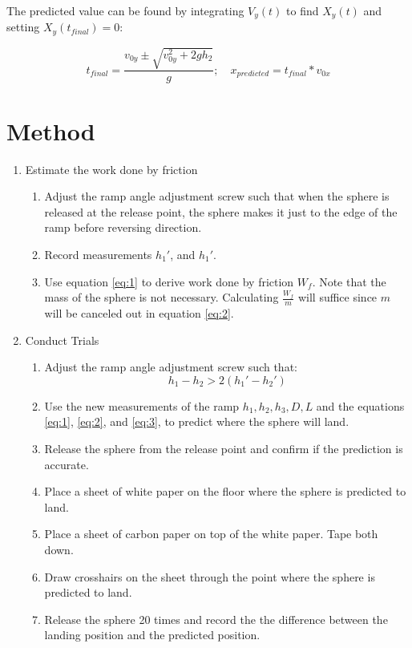 \documentclass{article}
\begin{document}
The predicted value can be found by integrating $V_{y}(t)$ to find $X_{y}(t)$ and setting $X_{y}(t_{final}) = 0$:


\begin{equation}
    t_{final} = \frac{v_{0y} \pm \sqrt{v_{0y}^2 + 2gh_{2}}}{g}; \quad x_{predicted} = t_{final} * v_{0x}
\end{equation}


\clearpage
\section{Method}
\begin{enumerate}

    \item Estimate the work done by friction 
        \begin{enumerate}
            \item Adjust the ramp angle adjustment screw such that when the sphere is released at the release point, the sphere makes it just to the edge of the ramp before reversing direction.
            \item Record measurements $h_{1}\ensuremath{'}$, and $h_{1}\ensuremath{'}$.
            \item Use equation \eqref{eq:1} to derive work done by friction $W_{f}$. Note that the mass of the sphere is not necessary. Calculating $\frac{W_{f}}{m}$ will suffice since $m$ will be canceled out in equation \eqref{eq:2}.
        \end{enumerate}

    \item Conduct Trials
        \begin{enumerate}
            \item Adjust the ramp angle adjustment screw such that: \\
                \begin{equation} h_{1} - h_{2} > 2(h_{1}\ensuremath{'} - h_{2}\ensuremath{'}) \end{equation}
            \item Use the new measurements of the ramp $h_{1}, h_{2}, h_{3}, D, L$ and the equations \eqref{eq:1}, \eqref{eq:2}, and \eqref{eq:3}, to predict where the sphere will land. 
            \item Release the sphere from the release point and confirm if the prediction is accurate.
            \item Place a sheet of white paper on the floor where the sphere is predicted to land.
            \item Place a sheet of carbon paper on top of the white paper. Tape both down.
            \item Draw crosshairs on the sheet through the point where the sphere is predicted to land.
            \item Release the sphere 20 times and record the the difference between the landing position and the predicted position.


\end{enumerate}
\end{enumerate}
\end{document}
